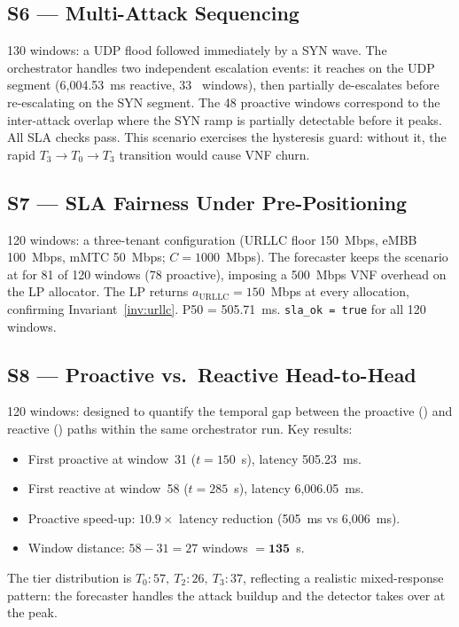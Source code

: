 \subsection{S6 --- Multi-Attack Sequencing}
130 windows: a UDP flood followed immediately by a SYN wave.
The orchestrator handles two independent escalation events: it reaches
 on the UDP segment (6{,}004.53~ms reactive, 33 ~windows),
then partially de-escalates before re-escalating on the SYN segment.
The 48 proactive windows correspond to the inter-attack overlap where the
SYN ramp is partially detectable before it peaks. All SLA checks pass.
This scenario exercises the hysteresis guard: without it, the rapid
$T_3 \to T_0 \to T_3$ transition would cause VNF churn.

\subsection{S7 --- SLA Fairness Under Pre-Positioning}
120 windows: a three-tenant configuration (URLLC floor 150~Mbps,
eMBB 100~Mbps, mMTC 50~Mbps; $C = 1000$~Mbps). The forecaster keeps
the scenario at  for 81 of 120 windows (78 proactive), imposing
a 500~Mbps VNF overhead on the LP allocator. The LP returns
$a_{\text{URLLC}} = 150$~Mbps at every allocation, confirming
Invariant~\ref{inv:urllc}.  P50 = 505.71~ms.
\texttt{sla\_ok = true} for all 120 windows.

\subsection{S8 --- Proactive vs.\ Reactive Head-to-Head}
120 windows: designed to quantify the temporal gap between the proactive
() and reactive () paths within the same orchestrator run.
Key results:
\begin{itemize}
  \item First proactive  at window~31 ($t = 150$~s),
        latency 505.23~ms.
  \item First reactive  at window~58 ($t = 285$~s),
        latency 6{,}006.05~ms.
  \item Proactive speed-up: $10.9\times$ latency reduction
        (505~ms vs 6{,}006~ms).
  \item Window distance: $58 - 31 = 27$ windows $= \mathbf{135}$~s.
\end{itemize}

The tier distribution is $T_0{:}57,\ T_2{:}26,\ T_3{:}37$, reflecting
a realistic mixed-response pattern: the forecaster handles the attack
buildup and the detector takes over at the peak.

